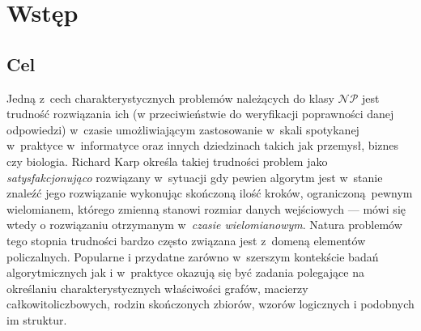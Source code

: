 \chapter{Wstęp}\label{Chapter_Introduction}
\section{Cel}\label{Section_Aim}
\par{
  Jedną z~cech charakterystycznych problemów należących do klasy $\mathcal{NP}$ jest trudność rozwiązania ich (w przeciwieństwie do weryfikacji poprawności danej odpowiedzi) w~czasie umożliwiającym zastosowanie w~skali spotykanej w~praktyce w~informatyce oraz innych dziedzinach takich jak przemysł, biznes czy biologia.
  Richard Karp określa takiej trudności problem jako \emph{satysfakcjonująco} rozwiązany w~sytuacji gdy pewien algorytm jest w~stanie znaleźć jego rozwiązanie wykonując skończoną ilość kroków, ograniczoną pewnym wielomianem, którego zmienną stanowi rozmiar danych wejściowych --- mówi się wtedy o rozwiązaniu otrzymanym w~\emph{czasie wielomianowym}.
  Natura problemów tego stopnia trudności bardzo często związana jest z~domeną elementów policzalnych.
  Popularne i przydatne zarówno w~szerszym kontekście badań algorytmicznych jak i w~praktyce okazują się być zadania polegające na określaniu charakterystycznych właściwości grafów, macierzy całkowitoliczbowych, rodzin skończonych zbiorów, wzorów logicznych i podobnych im struktur.
}
